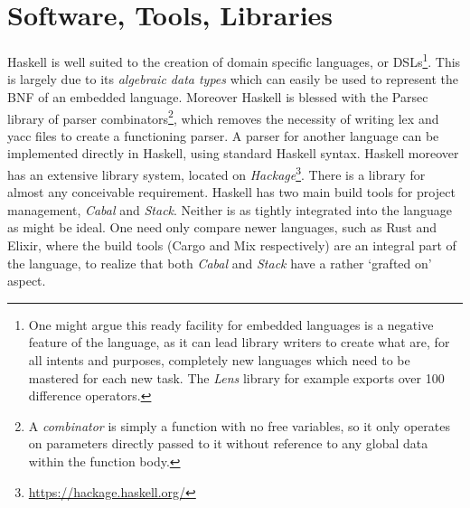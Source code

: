\documentclass[12pt, a4paper]{report}
\begin{document}
\section{Software, Tools, Libraries}
Haskell is well suited to the creation of domain specific languages, or \gls{DSL}s\footnote{One
might argue this ready facility for embedded languages is a negative feature of the
language, as it can lead library writers to create what are, for all intents and purposes,
completely new languages which need to be mastered for each new task. The \textit{Lens} library
for example exports over 100 difference operators.}. This is
largely due to its \textit{algebraic data types} which can easily be used to represent the BNF
of an embedded language. Moreover Haskell is blessed with the Parsec library\cite{leijen2001} of
parser combinators\footnote{A \textit{combinator} is simply a function with no free variables,
so it only operates on parameters directly passed to it without reference to any global data
within the function body.}, which removes the necessity of writing lex and yacc files to create
a functioning parser. A parser for another language can be implemented directly in Haskell,
using standard Haskell syntax. Haskell moreover has an extensive library system, located on
\textit{Hackage}\footnote{\url{https://hackage.haskell.org/}}. There is a library for almost any
conceivable requirement. Haskell has two main build tools for project management, \textit{Cabal} and
\textit{Stack}. Neither is as tightly integrated into the language as might be ideal. One need only
compare newer languages, such as Rust and Elixir, where the build tools (Cargo and Mix respectively)
are an integral part of the language, to realize that both \textit{Cabal} and \textit{Stack} have a
rather `grafted on' aspect.
\end{document}
